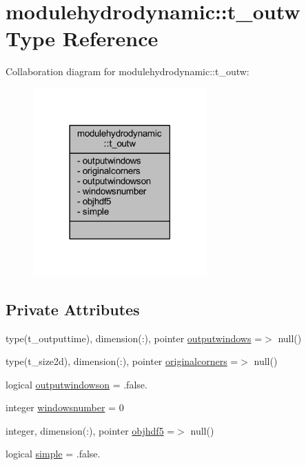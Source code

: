 \hypertarget{structmodulehydrodynamic_1_1t__outw}{}\section{modulehydrodynamic\+:\+:t\+\_\+outw Type Reference}
\label{structmodulehydrodynamic_1_1t__outw}


Collaboration diagram for modulehydrodynamic\+:\+:t\+\_\+outw\+:\nopagebreak
\begin{figure}[H]
\begin{center}
\leavevmode
\includegraphics[width=189pt]{structmodulehydrodynamic_1_1t__outw__coll__graph}
\end{center}
\end{figure}
\subsection*{Private Attributes}
\begin{DoxyCompactItemize}
\item 
type(t\+\_\+outputtime), dimension(\+:), pointer \mbox{\hyperlink{structmodulehydrodynamic_1_1t__outw_a273957fa543ee991af21976777527c58}{outputwindows}} =$>$ null()
\item 
type(t\+\_\+size2d), dimension(\+:), pointer \mbox{\hyperlink{structmodulehydrodynamic_1_1t__outw_a52616fd8e8d05b27927b988b8de64e2e}{originalcorners}} =$>$ null()
\item 
logical \mbox{\hyperlink{structmodulehydrodynamic_1_1t__outw_ae15d7da94651b6653d18b1b441df72e2}{outputwindowson}} = .false.
\item 
integer \mbox{\hyperlink{structmodulehydrodynamic_1_1t__outw_aa39aa0a74efcbff750bf97b1e4639932}{windowsnumber}} = 0
\item 
integer, dimension(\+:), pointer \mbox{\hyperlink{structmodulehydrodynamic_1_1t__outw_a1b47c4533bd5f1a91dcbdf36d6e28dc5}{objhdf5}} =$>$ null()
\item 
logical \mbox{\hyperlink{structmodulehydrodynamic_1_1t__outw_a24d69d8ca2643110db59845b29f3d389}{simple}} = .false.
\end{DoxyCompactItemize}



